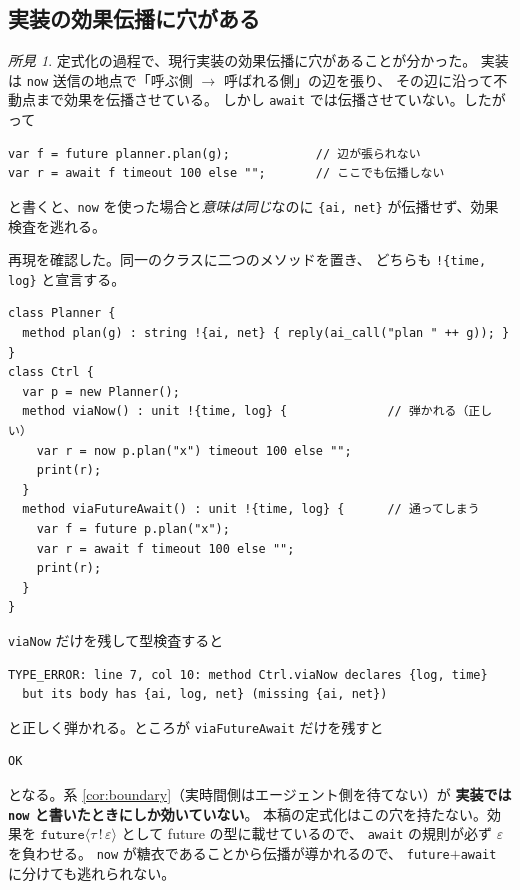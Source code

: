\documentclass[11pt,a4paper]{ltjsarticle}
\theoremstyle{definition}
\theoremstyle{remark}
\newtheorem{finding}[theorem]{所見}
\newcommand{\tfut}[2]{\ensuremath{\mathtt{future}\langle #1 \,!\, #2 \rangle}}
\begin{document}
\subsection{実装の効果伝播に穴がある}
\label{sec:gap}

\begin{finding}
定式化の過程で、現行実装の効果伝播に穴があることが分かった。
実装は \texttt{now} 送信の地点で「呼ぶ側 $\to$ 呼ばれる側」の辺を張り、
その辺に沿って不動点まで効果を伝播させている。
しかし \texttt{await} では伝播させていない。したがって
\begin{lstlisting}[language=AIPL]
var f = future planner.plan(g);            // 辺が張られない
var r = await f timeout 100 else "";       // ここでも伝播しない
\end{lstlisting}
と書くと、\texttt{now} を使った場合と\emph{意味は同じ}なのに
\texttt{\{ai, net\}} が伝播せず、効果検査を逃れる。
\end{finding}

再現を確認した。同一のクラスに二つのメソッドを置き、
どちらも \texttt{!\{time, log\}} と宣言する。

\begin{lstlisting}[language=AIPL]
class Planner {
  method plan(g) : string !{ai, net} { reply(ai_call("plan " ++ g)); }
}
class Ctrl {
  var p = new Planner();
  method viaNow() : unit !{time, log} {              // 弾かれる（正しい）
    var r = now p.plan("x") timeout 100 else "";
    print(r);
  }
  method viaFutureAwait() : unit !{time, log} {      // 通ってしまう
    var f = future p.plan("x");
    var r = await f timeout 100 else "";
    print(r);
  }
}
\end{lstlisting}

\noindent \texttt{viaNow} だけを残して型検査すると

\begin{lstlisting}
TYPE_ERROR: line 7, col 10: method Ctrl.viaNow declares {log, time}
  but its body has {ai, log, net} (missing {ai, net})
\end{lstlisting}

\noindent と正しく弾かれる。ところが \texttt{viaFutureAwait} だけを残すと

\begin{lstlisting}
OK
\end{lstlisting}

\noindent となる。系 \ref{cor:boundary}（実時間側はエージェント側を待てない）が
\textbf{実装では \texttt{now} と書いたときにしか効いていない}。
本稿の定式化はこの穴を持たない。効果を
$\tfut{\tau}{\varepsilon}$ として future の型に載せているので、
\texttt{await} の規則が必ず $\varepsilon$ を負わせる。
\texttt{now} が糖衣であることから伝播が導かれるので、
\texttt{future}$+$\texttt{await} に分けても逃れられない。
\end{document}
